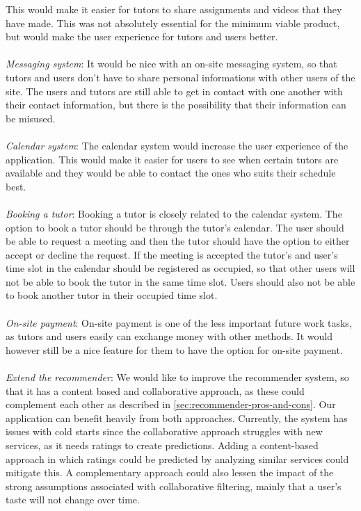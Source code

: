 This would make it easier for tutors to share assignments and videos that they have made. 
This was not absolutely essential for the minimum viable product, but would make the user experience for tutors and users better.
\\\\
\textit{Messaging system}: 
It would be nice with an on-site messaging system, so that tutors and users don't have to share personal informations with other users of the site.
The users and tutors are still able to get in contact with one another with their contact information, but there is the possibility that their information can be misused.
\\\\
\textit{Calendar system}:
The calendar system would increase the user experience of the application. 
This would make it easier for users to see when certain tutors are available and they would be able to contact the ones who suits their schedule best.
\\\\
\textit{Booking a tutor}:
Booking a tutor is closely related to the calendar system.
The option to book a tutor should be through the tutor's calendar. 
The user should be able to request a meeting and then the tutor should have the option to either accept or decline the request.
If the meeting is accepted the tutor's and user's time slot in the calendar should be registered as occupied, so that other users will not be able to book the tutor in the same time slot.
Users should also not be able to book another tutor in their occupied time slot.
\\\\
\textit{On-site payment}:
On-site payment is one of the less important future work tasks, as tutors and users easily can exchange money with other methods.
It would however still be a nice feature for them to have the option for on-site payment.
\\\\
\textit{Extend the recommender}:
We would like to improve the recommender system, so that it has a content based and collaborative approach, as these could complement each other as described in \autoref{sec:recommender-pros-and-cons}.
Our application can benefit heavily from both approaches.
Currently, the system has issues with cold starts since the collaborative approach struggles with new services, as it needs ratings to create predictions.
Adding a content-based approach in which ratings could be predicted by analyzing similar services could mitigate this.
A complementary approach could also lessen the impact of the strong assumptions associated with collaborative filtering, mainly that a user's taste will not change over time.
